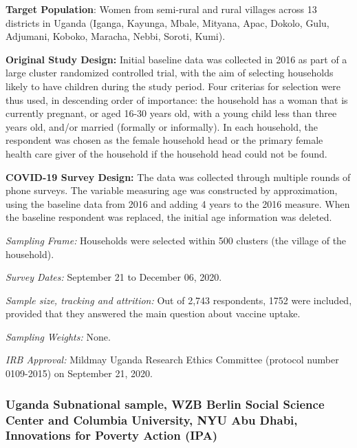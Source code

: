 \documentclass[
  12pt,
]{article}
\begin{document}
\textbf{Target Population}: Women from semi-rural and rural villages across 13 districts in Uganda (Iganga, Kayunga, Mbale, Mityana, Apac, Dokolo, Gulu, Adjumani, Koboko, Maracha, Nebbi, Soroti, Kumi).

\textbf{Original Study Design:} Initial baseline data was collected in 2016 as part of a large cluster randomized controlled trial, with the aim of selecting households likely to have children during the study period. Four criterias for selection were thus used, in descending order of importance: the household has a woman that is currently pregnant, or aged 16-30 years old, with a young child less than three years old, and/or married (formally or informally). In each household, the respondent was chosen as the female household head or the primary female health care giver of the household if the household head could not be found.

\textbf{COVID-19 Survey Design:} The data was collected through multiple rounds of phone surveys. The variable measuring age was constructed by approximation, using the baseline data from 2016 and adding 4 years to the 2016 measure. When the baseline respondent was replaced, the initial age information was deleted.

\emph{Sampling Frame:} Households were selected within 500 clusters (the village of the household).

\emph{Survey Dates:} September 21 to December 06, 2020.

\emph{Sample size, tracking and attrition:} Out of 2,743 respondents, 1752 were included, provided that they answered the main question about vaccine uptake.

\emph{Sampling Weights:} None.

\emph{IRB Approval:} Mildmay Uganda Research Ethics Committee (protocol number 0109-2015) on September 21, 2020.

\hypertarget{uganda-subnational-sample-wzb-berlin-social-science-center-and-columbia-university-nyu-abu-dhabi-innovations-for-poverty-action-ipa}{%
\subsubsection*{Uganda Subnational sample, WZB Berlin Social Science Center and Columbia University, NYU Abu Dhabi, Innovations for Poverty Action (IPA)}\label{uganda-subnational-sample-wzb-berlin-social-science-center-and-columbia-university-nyu-abu-dhabi-innovations-for-poverty-action-ipa}}
\end{document}
